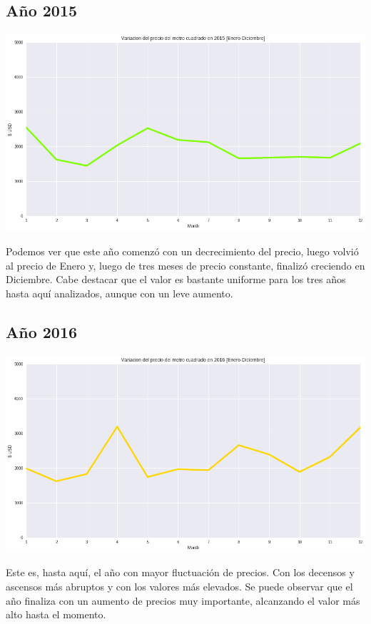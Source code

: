 \documentclass[a4paper, 10pt]{article}
\newcommand\tab[1][0.5cm]{\hspace*{#1}}
\begin{document}
			\subsection{Año 2015}
				\begin{center}
					\includegraphics[width=\textwidth]{images/m2Progression2015}
				\end{center}
				\tab Podemos ver que este año comenzó con un decrecimiento del precio, luego volvió al precio de Enero y, luego de
				tres meses de precio constante, finalizó creciendo en Diciembre. Cabe destacar que el valor es bastante uniforme para
				los tres años hasta aquí analizados, aunque con un leve aumento.
			\subsection{Año 2016}
				\begin{center}
					\includegraphics[width=\textwidth]{images/m2Progression2016}
				\end{center}
				\tab Este es, hasta aquí, el año con mayor fluctuación de precios. Con los decensos y ascensos más abruptos y con
				los valores más elevados. Se puede observar que el año finaliza con un aumento de precios muy importante, alcanzando
				el valor más alto hasta el momento.
\end{document}
